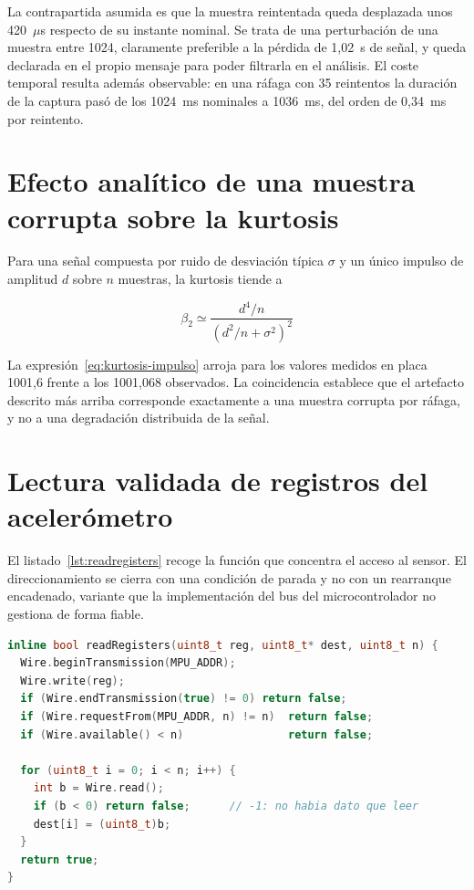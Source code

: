 La contrapartida asumida es que la muestra reintentada queda desplazada unos
\mbox{420 $\mu$s} respecto de su instante nominal. Se trata de una perturbación de una
muestra entre 1024, claramente preferible a la pérdida de \mbox{1,02 s} de señal, y queda
declarada en el propio mensaje para poder filtrarla en el análisis. El coste temporal
resulta además observable: en una ráfaga con 35 reintentos la duración de la captura pasó de
los \mbox{1024 ms} nominales a \mbox{1036 ms}, del orden de \mbox{0,34 ms} por reintento.

\section{Efecto analítico de una muestra corrupta sobre la kurtosis}

Para una señal compuesta por ruido de desviación típica $\sigma$ y un único impulso de amplitud $d$
sobre $n$ muestras, la kurtosis tiende a

\begin{equation}
\label{eq:kurtosis-impulso}
\beta_2 \simeq \frac{d^4/n}{\left(d^2/n + \sigma^2\right)^2}
\end{equation}

La expresión~\ref{eq:kurtosis-impulso} arroja para los valores medidos en placa 1001,6 frente a los
1001,068 observados. La coincidencia establece que el artefacto descrito más arriba
corresponde exactamente a una muestra corrupta por ráfaga, y no a una
degradación distribuida de la señal.

\section{Lectura validada de registros del acelerómetro}

El listado~\ref{lst:readregisters} recoge la función que concentra el acceso al sensor. El
direccionamiento se cierra con una condición de parada y no con un rearranque encadenado, variante
que la implementación del bus del microcontrolador no gestiona de forma fiable.

\begin{lstlisting}[language=C++, caption={Lectura validada de registros del acelerómetro.}, label={lst:readregisters}]
inline bool readRegisters(uint8_t reg, uint8_t* dest, uint8_t n) {
  Wire.beginTransmission(MPU_ADDR);
  Wire.write(reg);
  if (Wire.endTransmission(true) != 0) return false;
  if (Wire.requestFrom(MPU_ADDR, n) != n)  return false;
  if (Wire.available() < n)                return false;

  for (uint8_t i = 0; i < n; i++) {
    int b = Wire.read();
    if (b < 0) return false;      // -1: no habia dato que leer
    dest[i] = (uint8_t)b;
  }
  return true;
}
\end{lstlisting}

